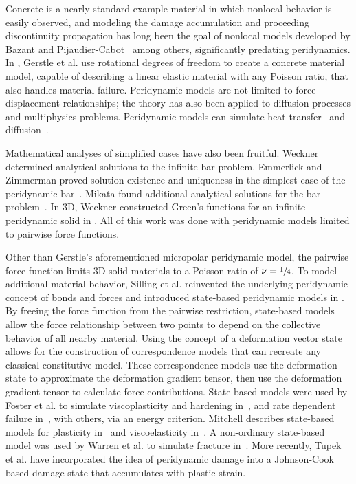 Concrete is a nearly standard example material in which nonlocal behavior is easily observed, and modeling the damage accumulation and proceeding discontinuity propagation has long been the goal of nonlocal models developed by Bazant and Pijaudier-Cabot~\cite{bazant1988nonlocal} among others, significantly predating peridynamics.
In \cite{gerstle2007peridynamic}, Gerstle et al. use rotational degrees of freedom to create a concrete material model, capable of describing a linear elastic material with any Poisson ratio, that also handles material failure.
Peridynamic models are not limited to force-displacement relationships; the theory has also been applied to diffusion processes and multiphysics problems.
Peridynamic models can simulate heat transfer~\cite{bobaru2010peridynamic} and diffusion~\cite{burch2011classical}.

Mathematical analyses of simplified cases have also been fruitful.
Weckner~\cite{weckner2005effect} determined analytical solutions to the infinite bar problem. 
Emmerlick and Zimmerman proved solution existence and uniqueness in the simplest case of the peridynamic bar~\cite{emmrich2007analysis}.
Mikata found additional analytical solutions for the bar problem~\cite{mikata2012analytical}.
In 3D, Weckner constructed Green's functions for an infinite peridynamic solid in \cite{weckner2009green}.
All of this work was done with peridynamic models limited to pairwise force functions.

Other than Gerstle's aforementioned micropolar peridynamic model, the pairwise force function limits 3D solid materials to a Poisson ratio of  \(\nu=\sfrac{1}{4}\). 
To model additional material behavior, Silling et al. reinvented the underlying peridynamic concept of bonds and forces and introduced state-based peridynamic models in \cite{silling2007peridynamic}.
By freeing the force function from the pairwise restriction, state-based models allow the force relationship between two points to depend on the collective behavior of all nearby material.
Using the concept of a deformation vector state allows for the construction of correspondence models that can recreate any classical constitutive model.
These correspondence models use the deformation state to approximate the deformation gradient tensor, then use the deformation gradient tensor to calculate force contributions.
State-based models were used by Foster et al. to simulate viscoplasticity and hardening in~\cite{foster2010viscoplasticity}, and rate dependent failure in~\cite{foster2011energy}, with others, via an energy criterion.
Mitchell describes state-based models for plasticity in~\cite{mitchell2011nonlocal} and viscoelasticity in~\cite{mitchell2011non}.
A non-ordinary state-based model was used by Warren et al. to simulate fracture in~\cite{warren2009non}.
More recently, Tupek et al. have incorporated the idea of peridynamic damage into a Johnson-Cook based damage state that accumulates with plastic strain\cite{tupek2013approach}.
%
